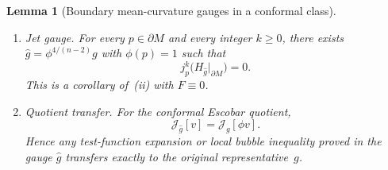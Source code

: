 \documentclass[11pt,reqno,a4paper]{amsart}
\numberwithin{equation}{section}
\theoremstyle{plain}
\newtheorem{lemma}[theorem]{Lemma}
\theoremstyle{remark}
\theoremstyle{plain}
\begin{document}
\begin{lemma}[Boundary mean-curvature gauges in a conformal class]
\begin{enumerate}

\item[\textup{(iii)}]
\emph{Jet gauge.}
For every $p\in\partial M$ and every integer $k\ge0$,
there exists $\hat g=\phi^{4/(n-2)}g$ with $\phi(p)=1$ such that
\[
j_p^k\bigl(H_{\hat g}|_{\partial M}\bigr)=0.
\]
This is a corollary of~(ii) with $F\equiv0$.

\item[\textup{(iv)}]
\emph{Quotient transfer.}
For the conformal Escobar quotient,
\begin{equation}\label{eq:quotient-transfer}
\mathcal J_{\hat g}[v]=\mathcal J_g[\phi v].
\end{equation}
Hence any test-function expansion or local bubble inequality proved in the
gauge $\hat g$ transfers exactly to the original representative~$g$.
\end{enumerate}
\end{lemma}
\end{document}
